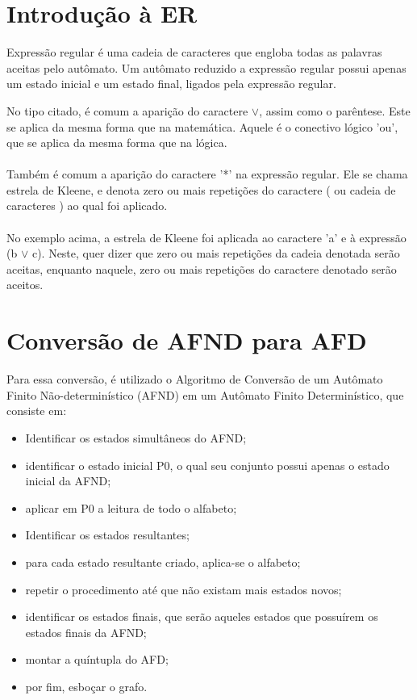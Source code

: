 \documentclass[a4paper,10pt]{article} %
\begin{document}
\section{Introdução à ER}

    Expressão regular é uma cadeia de caracteres que engloba todas as palavras aceitas pelo autômato. Um autômato reduzido a expressão regular possui apenas um estado inicial e um estado final, ligados pela expressão regular.
\begin{center}
\end{center}


    No tipo citado, é comum a aparição do caractere {$\lor$}, assim como o parêntese. Este se aplica da mesma forma que na matemática. Aquele é o conectivo lógico 'ou', que se aplica da mesma forma que na lógica.\\\\Também é comum a aparição do caractere '*' na expressão regular. Ele se chama estrela de Kleene, e denota zero ou mais repetições do caractere ( ou cadeia de caracteres ) ao qual foi aplicado.\\\\No exemplo acima, a estrela de Kleene foi aplicada ao caractere 'a' e à expressão (b {$\lor$} c). Neste, quer dizer que zero ou mais repetições da cadeia denotada serão aceitas, enquanto naquele, zero ou mais repetições do caractere denotado serão aceitos.


\section{Conversão de AFND para AFD}

    Para essa conversão, é utilizado o Algoritmo de Conversão de um Autômato Finito Não-determinístico (AFND) em um Autômato Finito Determinístico, que consiste em:
    \begin{itemize}
        \item Identificar os estados simultâneos do AFND;
        \item identificar o estado inicial P0, o qual seu conjunto possui apenas o estado inicial da AFND;
        \item aplicar em P0 a leitura de todo o alfabeto;
        \item Identificar os estados resultantes;
        \item para cada estado resultante criado, aplica-se o alfabeto;
        \item repetir o procedimento até que não existam mais estados novos;
        \item identificar os estados finais, que serão aqueles estados que possuírem os estados finais da AFND;     
        \item montar a quíntupla do AFD;     
        \item por fim, esboçar o grafo.    
    \end{itemize}
\end{document}
